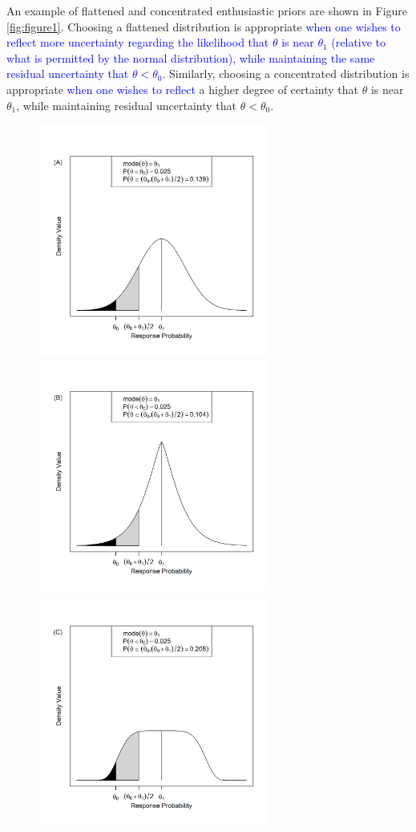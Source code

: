 \documentclass[useAMS,usenatbib,referee]{biom}
\begin{document}
An example of flattened and concentrated enthusiastic priors are shown in Figure \ref{fig:figure1}. 
%
Choosing a flattened distribution is appropriate \textcolor{blue}{when one wishes to reflect more uncertainty regarding the likelihood that 
$\theta$ is near $\theta_1$ (relative to what is permitted by the normal distribution), while maintaining the same residual uncertainty 
that $\theta<\theta_0$}. 
%
Similarly, choosing a concentrated distribution is appropriate \textcolor{blue}{when one wishes to reflect} a higher 
degree of certainty that $\theta$ is near $\theta_1$, while maintaining residual uncertainty that $\theta<\theta_0$. 
\begin{figure}
\begin{center}
\includegraphics[width=3in]{figure1a.png}
\includegraphics[width=3in]{figure1b.png}
\includegraphics[width=3in]{figure1c.png}

\end{center}
\end{figure}
\end{document}
